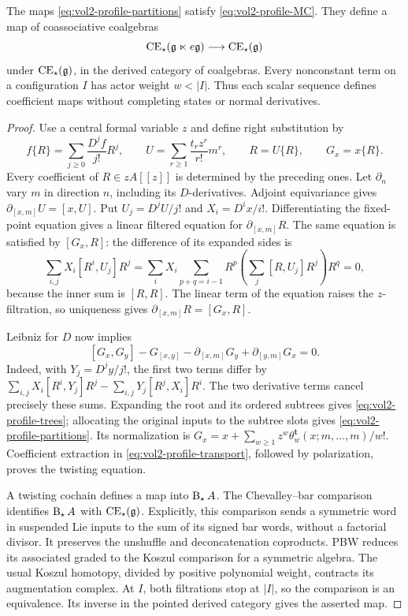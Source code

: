 \begin{theorem}\label{thm:vol2-profiles}
The maps \eqref{eq:vol2-profile-partitions} satisfy
\eqref{eq:vol2-profile-MC}. They define a map of coassociative
coalgebras
\[
 \operatorname{CE}_{\star}(\mathfrak g\ltimes e\mathfrak g)
       \longrightarrow\operatorname{CE}_{\star}(\mathfrak g)
\]
under $\operatorname{CE}_{\star}(\mathfrak g)$, in the derived category of coalgebras.
Every nonconstant term on a configuration $I$ has actor weight
$w<|I|$. Thus each scalar sequence defines coefficient maps without
completing states or normal derivatives.
\end{theorem}

\begin{proof}
Use a central formal variable $z$ and define right substitution by
\[
 f\{R\}=\sum_{j\geq0}\frac{D^jf}{j!}R^j,
 \qquad U=\sum_{r\geq1}\frac{t_rz^r}{r!}m^r,
 \qquad R=U\{R\},\qquad G_x=x\{R\}.
\]
Every coefficient of $R\in zA[[z]]$ is determined by the preceding
ones. Let $\partial_n$ vary $m$ in direction $n$, including its
$D$-derivatives. Adjoint equivariance gives
$\partial_{[x,m]}U=[x,U]$. Put $U_j=D^jU/j!$ and $X_i=D^ix/i!$.
Differentiating the fixed-point equation gives a linear filtered
equation for $\partial_{[x,m]}R$. The same equation is satisfied by
$[G_x,R]$: the difference of its expanded sides is
\[
 \sum_{i,j}X_i[R^i,U_j]R^j
 =\sum_iX_i\sum_{p+q=i-1}R^p
                 \left(\sum_j[R,U_j]R^j\right)R^q=0,
\]
because the inner sum is $[R,R]$. The linear term of the equation
raises the $z$-filtration, so uniqueness gives
$\partial_{[x,m]}R=[G_x,R]$.

Leibniz for $D$ now implies
\begin{equation}\label{eq:vol2-profile-transport}
 [G_x,G_y]-G_{[x,y]}
       -\partial_{[x,m]}G_y+\partial_{[y,m]}G_x=0.
\end{equation}
Indeed, with $Y_j=D^jy/j!$, the first two terms differ by
$\sum_{i,j}X_i[R^i,Y_j]R^j-\sum_{i,j}Y_j[R^j,X_i]R^i$.
The two derivative terms cancel precisely these sums. Expanding the
root and its ordered subtrees gives
\eqref{eq:vol2-profile-trees}; allocating the original inputs to the
subtree slots gives \eqref{eq:vol2-profile-partitions}. Its
normalization is
$G_x=x+\sum_{w\geq1}z^w\theta_w^{\mathbf t}(x;m,\ldots,m)/w!$.
Coefficient extraction in \eqref{eq:vol2-profile-transport}, followed
by polarization, proves the twisting equation.

A twisting cochain defines a map into $\operatorname{B}_{\star} A$. The Chevalley--bar
comparison identifies $\operatorname{B}_{\star} A$ with $\operatorname{CE}_{\star}(\mathfrak g)$.
Explicitly, this comparison sends a symmetric word in suspended Lie
inputs to the sum of its signed bar words, without a factorial divisor.
It preserves the unshuffle and deconcatenation coproducts. PBW reduces
its associated graded to the Koszul comparison for a symmetric algebra.
The usual Koszul homotopy, divided by positive polynomial weight,
contracts its augmentation complex. At $I$, both filtrations stop
at $|I|$, so the comparison is an equivalence. Its inverse in the
pointed derived category gives the asserted map.


\end{proof}
